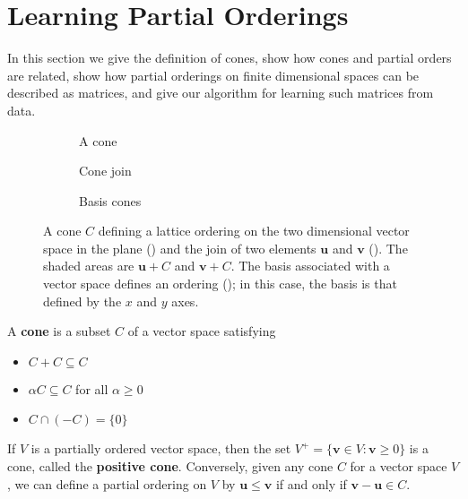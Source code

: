 \section{Learning Partial Orderings}

In this section we give the definition of cones, show how cones and partial orders are related, show how partial orderings on finite dimensional spaces can be described as matrices, and give our algorithm for
learning such matrices from data.

\begin{figure*}
  \centering
  \begin{subfigure}[b]{0.3\textwidth}
    \scalebox{0.5}{
      
    }
    \vspace{0.01cm}
    \caption{A cone}
    \label{fig:cone}
  \end{subfigure}
  \begin{subfigure}[b]{0.3\textwidth}
    \scalebox{0.5}{
      
    }
    \caption{Cone join}
    \label{fig:join}
  \end{subfigure}
  \begin{subfigure}[b]{0.3\textwidth}
    \scalebox{0.7}{
      
    }
    \vspace{0.01cm}
    \caption{Basis cones}
    \label{fig:basis}
  \end{subfigure}
  \caption{A cone $C$ defining a lattice ordering on the two
    dimensional vector space in the plane () and the
    join of two elements $\mathbf{u}$ and $\mathbf{v}$ (). The shaded
    areas are $\mathbf{u} + C$ and $\mathbf{v} + C$. The basis associated with a vector
    space defines an ordering (); in this case, the
    basis is that defined by the $x$ and $y$ axes.}
\end{figure*}

A \textbf{cone} is a subset $C$ of a vector space satisfying
\begin{itemize}
\item $C + C \subseteq C$
\item $\alpha C \subseteq C$ for all $\alpha \ge 0$
\item $C \cap (-C) = \{0\}$
\end{itemize}
If $V$ is a partially ordered vector space, then the set $V^+ = \{\mathbf{v}
\in V : \mathbf{v} \ge 0\}$ is a cone, called the \textbf{positive
  cone}. Conversely, given any cone $C$ for a vector space $V$, we can
define a partial ordering on $V$ by $\mathbf{u} \le \mathbf{v}$ 
if and only if $\mathbf{v} - \mathbf{u} \in C$.

